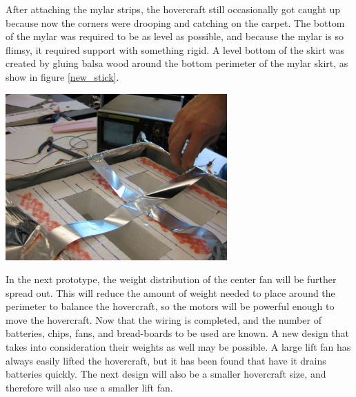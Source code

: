 After attaching the mylar strips, the hovercraft still occasionally got caught up because now the corners 
were drooping and catching on the carpet. The bottom of the mylar was required to be as level as possible, 
and because the mylar is so flimsy, it required support with something rigid. A level bottom of the skirt
was created by gluing balsa wood around the bottom perimeter of the mylar skirt, as show in figure \ref{new_stick}.

\begin{center}
  \includegraphics[width=85mm]{imageSources/designProblemsnew_stick.png}
\end{center}
\label{new_stick}

In the next prototype, the weight distribution of the center fan will be further spread out. This will reduce the amount of weight needed to place around the perimeter to balance the hovercraft, so the motors will be powerful enough to move the hovercraft. Now that the wiring is completed, and the number of batteries, chips, fans, and bread-boards to be used are known.  A new design that takes into consideration their weights as well may be possible. A large lift fan has always easily lifted the hovercraft, but it has been found that have it drains batteries quickly.  The next design will also be a smaller hovercraft size, and therefore will also use a smaller lift fan.


